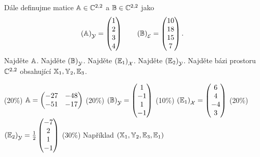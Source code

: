 \documentclass{article}
\newcommand{\mathbasis}{\ensuremath{\mathcal}}
\newcommand{\mathfield}{\ensuremath{\mathbb}}
\newcommand{\mathmat}{\ensuremath{\mathbb}}
\begin{document}
\begin{Exercise}[name=Úkol, label=bases]
\[	\]
	Dále definujme matice \( \mathmat{A} \in \mathfield{C}^{2, 2} \) a \( \mathmat{B} \in \mathfield{C}^{2, 2} \) jako
	\[
		\left( \mathmat{A} \right)_\mathbasis{Y} = \begin{pmatrix} 1 \\ 2 \\ 3 \\ 4 \end{pmatrix} \qquad
		\left( \mathmat{B} \right)_\mathbasis{E} = \begin{pmatrix} 10 \\ 18 \\ 15 \\ 7 \end{pmatrix}\text{.}
	\]
	\Question Najděte \( \mathmat{A} \).
	\Question Najděte \( \left( \mathmat{B} \right)_\mathbasis{Y} \).
	\Question Najděte \( \left( \mathmat{E}_1 \right)_\mathbasis{X} \).
	\Question Najděte \( \left( \mathmat{E}_2 \right)_\mathbasis{Y} \).
	\Question Najděte bázi prostoru \( \mathfield{C}^{2, 2} \) obsahující \( \mathmat{X}_1, \mathmat{Y}_2, \mathmat{E}_3 \).
\end{Exercise}

\begin{Answer}[ref=bases]
	\Question (20\%) \quad \( \mathmat{A} = \begin{pmatrix} -27 & -48 \\ -51 & -17 \end{pmatrix} \)
	\Question (20\%) \quad \( \left( \mathmat{B} \right)_\mathbasis{Y} = \begin{pmatrix} 1 \\ -1 \\ 1 \\ -1 \end{pmatrix} \)
	\Question (10\%) \quad \( \left( \mathmat{E}_1 \right)_\mathbasis{X} = \begin{pmatrix} 6 \\ 4 \\ -4 \\ 3 \end{pmatrix} \)
	\Question (20\%) \quad \( \left( \mathmat{E}_2 \right)_\mathbasis{Y} = \frac{1}{2} \begin{pmatrix} -7 \\ 2 \\ 1 \\ -1 \end{pmatrix} \)
	\Question (30\%) \quad Například \( \left( \mathmat{X}_1, \mathmat{Y}_2, \mathmat{E}_3, \mathmat{E}_1 \right) \)
\end{Answer}
\end{document}
